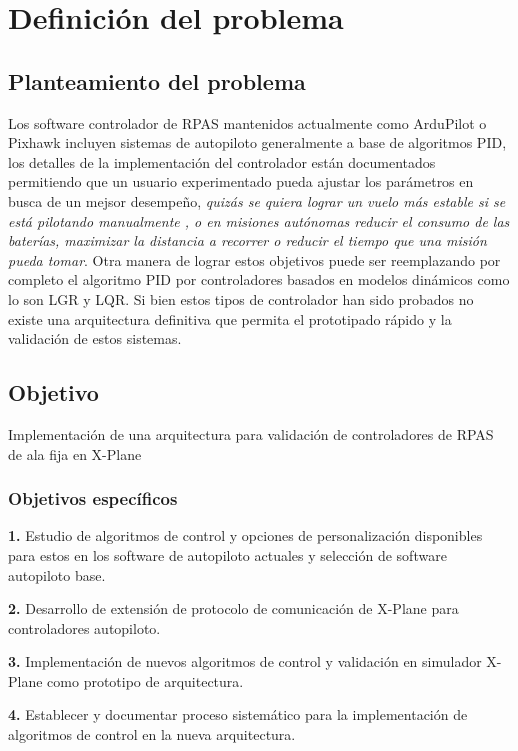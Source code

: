\chapter{Definición del problema}
\section{Planteamiento del problema}
Los software controlador de RPAS mantenidos actualmente como ArduPilot o Pixhawk incluyen sistemas de autopiloto generalmente a base de algoritmos PID, los detalles de la implementación del controlador están documentados \cite{px4-control-diagram} permitiendo que un usuario experimentado pueda ajustar los parámetros en busca de un mejsor desempeño, \emph{quizás se quiera lograr un vuelo más estable si se está pilotando manualmente \cite{betaflight-pid-tuning}, o en misiones autónomas reducir el consumo de las baterías, maximizar la distancia a recorrer o reducir el tiempo que una misión pueda tomar}. Otra manera de lograr estos objetivos puede ser reemplazando por completo el algoritmo PID por controladores basados en modelos dinámicos como lo son LGR y LQR. Si bien estos tipos de controlador han sido probados \cite{yt-lqr} no existe una arquitectura definitiva que permita el prototipado rápido y la validación de estos sistemas.

\section{Objetivo}

Implementación de una arquitectura para validación de controladores de RPAS de ala fija en X-Plane

\subsection{Objetivos específicos}

\textbf{1.} Estudio de algoritmos de control y opciones de personalización disponibles para estos en los software de autopiloto actuales y selección de software autopiloto base.

\textbf{2.} Desarrollo de extensión de protocolo de comunicación de X-Plane para controladores autopiloto.

\textbf{3.} Implementación de nuevos algoritmos de control y validación en simulador X-Plane como prototipo de arquitectura.

\textbf{4.} Establecer y documentar proceso sistemático para la implementación de algoritmos de control en la nueva arquitectura.

